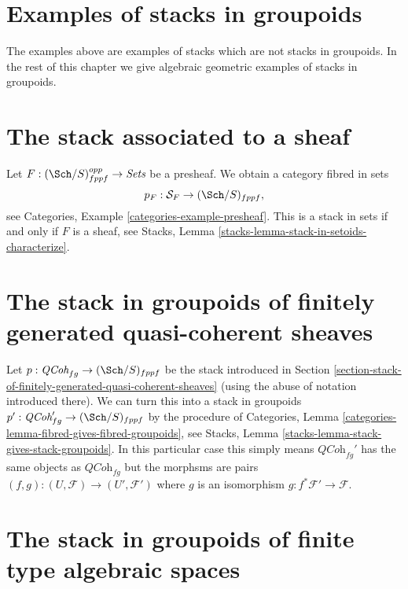 \section{Examples of stacks in groupoids}
\label{section-examples-stacks-in-groupoids}

\noindent
The examples above are examples of stacks which are not stacks in
groupoids. In the rest of this chapter we give
algebraic geometric examples of stacks in groupoids.



\section{The stack associated to a sheaf}
\label{section-stack-associated-to-sheaf}

\noindent
Let $F : (\Sch/S)_{fppf}^{opp} \to \textit{Sets}$ be a presheaf.
We obtain a category fibred in sets
$$
p_F : \mathcal{S}_F \to (\Sch/S)_{fppf},
$$
see
Categories, Example \ref{categories-example-presheaf}.
This is a stack in sets if and only if $F$ is a sheaf, see
Stacks, Lemma \ref{stacks-lemma-stack-in-setoids-characterize}.



\section{The stack in groupoids of finitely generated quasi-coherent sheaves}
\label{section-stack-in-groupoids-of-quasi-coherent-sheaves}

\noindent
Let $p : \textit{QCoh}_{fg} \to (\Sch/S)_{fppf}$ be the stack
introduced in
Section \ref{section-stack-of-finitely-generated-quasi-coherent-sheaves}
(using the abuse of notation introduced there).
We can turn this into a stack in groupoids
$p' : \textit{QCoh}_{fg}' \to (\Sch/S)_{fppf}$ by
the procedure of
Categories, Lemma \ref{categories-lemma-fibred-gives-fibred-groupoids},
see
Stacks, Lemma \ref{stacks-lemma-stack-gives-stack-groupoids}.
In this particular case this simply means $\textit{QCoh}_{fg}'$ has
the same objects as $\textit{QCoh}_{fg}$ but the morphsms are
pairs $(f, g) : (U, \mathcal{F}) \to (U', \mathcal{F}')$
where $g$ is an isomorphism $g : f^*\mathcal{F}' \to \mathcal{F}$.


\section{The stack in groupoids of finite type algebraic spaces}
\label{section-stack-in-groupoids-of-finite-type-spaces}

